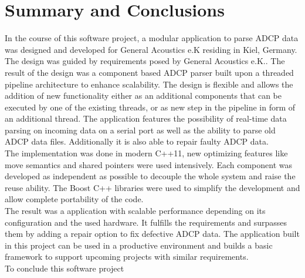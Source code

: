\chapter{Summary and Conclusions}
In the course of this software project, a modular application to parse ADCP data was designed and developed for General Acoustics e.K residing in Kiel, Germany. The design was guided by requirements posed by General Acoustics e.K.. The result of the design was a component based ADCP parser built upon a threaded pipeline architecture to enhance scalability. The design is flexible and allows the addition of new functionality either as an additional components that can be executed by one of the existing threads, or as new step in the pipeline in form of an additional thread. The application features the possibility of real-time data parsing on incoming data on a serial port as well as the ability to parse old ADCP data files. Additionally it is also able to repair faulty ADCP data.\\
The implementation was done in modern C++11, new optimizing features like move semantics and shared pointers were used intensively. Each component was developed as independent as possible to decouple the whole system and raise the reuse ability. The Boost C++ libraries were used to simplify the development and allow complete portability of the code.\\
The result was a application with scalable performance depending on its configuration and the used hardware. It fulfills the requirements and surpasses them by adding a repair option to fix defective ADCP data. The application built in this project can be used in a productive environment and builds a basic framework to support upcoming projects with similar requirements.\\

To conclude this software project 


